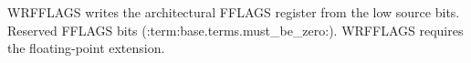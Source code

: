 WRFFLAGS writes the architectural FFLAGS register from the low source bits. Reserved FFLAGS bits (:term:base.terms.must_be_zero:). WRFFLAGS requires the floating-point extension.
